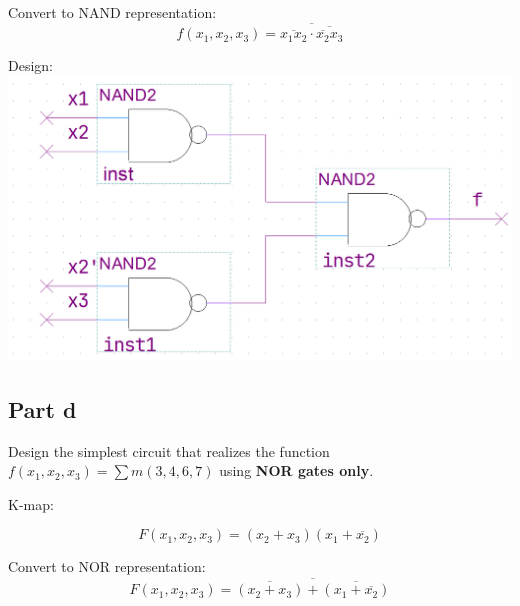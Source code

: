 \documentclass[12pt, a4paper]{article}
\begin{document}
	Convert to NAND representation:
	$$f(x_1, x_2, x_3) = \overline{\overline{x_1 x_2} \cdot \overline{\overline{x_2} x_3}}$$
	
	Design:\\
	\includegraphics[scale=0.5]{1c.png}
	
	\subsection*{Part d}
	Design the simplest circuit that realizes the function $f(x_1, x_2, x_3) = \sum{m(3, 4, 6, 7)}$ using \textbf{NOR gates only}.

	K-map:
	\begin{center}
	\end{center}
	$$F(x_1, x_2, x_3) = (x_2 + x_3)(x_1 + \overline{x_2})$$
	
	Convert to NOR representation:
	$$F(x_1, x_2, x_3) = \overline{\overline{(x_2 + x_3)} + \overline{(x_1 + \overline{x_2})}}$$
	
\end{document}
